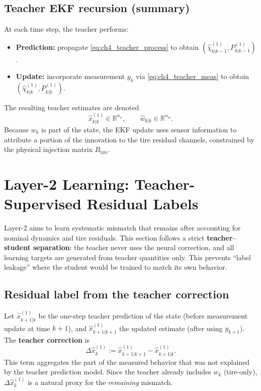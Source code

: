 \subsection{Teacher EKF recursion (summary)}\label{ch4_subsec_teacher_recursion}
At each time step, the teacher performs:
\begin{itemize}
    \item \textbf{Prediction:} propagate \eqref{eq:ch4_teacher_process} to obtain $(\hat\chi^{(1)}_{k|k-1},P^{(1)}_{k|k-1})$.
    \item \textbf{Update:} incorporate measurement $y_k$ via \eqref{eq:ch4_teacher_meas} to obtain $(\hat\chi^{(1)}_{k|k},P^{(1)}_{k|k})$.
\end{itemize}
The resulting teacher estimates are denoted
\begin{equation}
    \hat x^{(1)}_{k|k} \in \mathbb{R}^{n_x},\qquad \hat w_{k|k} \in \mathbb{R}^{n_w}.
\end{equation}
Because $w_k$ is part of the state, the EKF update uses sensor information to attribute a portion of the innovation to the tire residual channels, constrained by the physical injection matrix $B_{\text{tire}}$.

\section{Layer-2 Learning: Teacher-Supervised Residual Labels}\label{ch4_sec_learning}

Layer-2 aims to learn systematic mismatch that remains after accounting for nominal dynamics and tire residuals. This section follows a strict \textbf{teacher--student separation}: the teacher never uses the neural correction, and all learning targets are generated from teacher quantities only. This prevents ``label leakage'' where the student would be trained to match its own behavior.

\subsection{Residual label from the teacher correction}\label{ch4_subsec_label}
Let $\hat x^{(1)}_{k+1|k}$ be the one-step teacher prediction of the state (before measurement update at time $k+1$), and $\hat x^{(1)}_{k+1|k+1}$ the updated estimate (after using $y_{k+1}$). The \textbf{teacher correction} is
\begin{equation}\label{eq:ch4_teacher_correction}
    \Delta \hat x^{(1)}_{k} := \hat x^{(1)}_{k+1|k+1} - \hat x^{(1)}_{k+1|k}.
\end{equation}
This term aggregates the part of the measured behavior that was not explained by the teacher prediction model. Since the teacher already includes $w_k$ (tire-only), $\Delta \hat x^{(1)}_{k}$ is a natural proxy for the \emph{remaining} mismatch.

